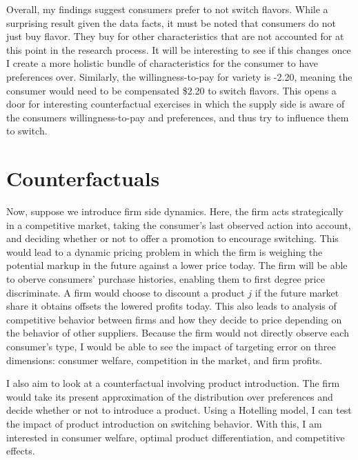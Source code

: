 \documentclass[11pt]{article}
\theoremstyle{definition}
\theoremstyle{remark}
\begin{document}
Overall, my findings suggest consumers prefer to not switch flavors. While a surprising result given the data facts, it must be noted that consumers do not just buy flavor. They buy for other characteristics that are not accounted for at this point in the research process. It will be interesting to see if this changes once I create a more holistic bundle of characteristics for the consumer to have preferences over. Similarly, the willingness-to-pay for variety is -2.20, meaning the consumer would need to be compensated \$2.20 to switch flavors. This opens a door for interesting counterfactual exercises in which the supply side is aware of the consumers willingness-to-pay and preferences, and thus try to influence them to switch. 

\section{Counterfactuals}

Now, suppose we introduce firm side dynamics. Here, the firm acts strategically in a competitive market, taking the consumer's last observed action into account, and deciding whether or not to offer a promotion to encourage switching. This would lead to a dynamic pricing problem in which the firm is weighing the potential markup in the future against a lower price today. The firm will be able to oberve consumers' purchase histories, enabling them to first degree price discriminate. A firm would choose to discount a product $j$ if the future market share it obtains offsets the lowered profits today. This also leads to analysis of competitive behavior between firms and how they decide to price depending on the behavior of other suppliers. Because the firm would not directly observe each consumer's type, I would be able to see the impact of targeting error on three dimensions: consumer welfare, competition in the market, and firm profits.

I also aim to look at a counterfactual involving product introduction. The firm would take its present approximation of the distribution over preferences and decide whether or not to introduce a product. Using a Hotelling model, I can test the impact of product introduction on switching behavior. With this, I am interested in consumer welfare, optimal product differentiation, and competitive effects.

\end{document}
